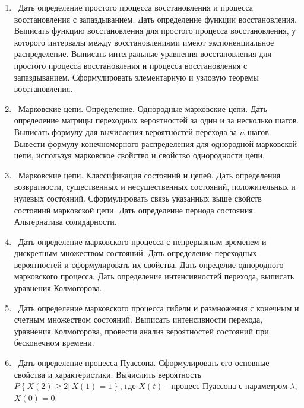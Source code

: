 %
%


\begin{enumerate}

\item Дать определение простого процесса восстановления и процесса восстановления
с запаздыванием. Дать определение функции восстановления. Выписать
функцию восстановления для простого процесса восстановления, у которого
интервалы между восстановлениями имеют экспоненциальное распределение.
Выписать интегральные уравнения восстановления для простого процесса
восстановления и процесса восстановления с запаздыванием. Сформулировать
элементарную и узловую теоремы восстановления.

\item Марковские цепи. Определение. Однородные марковские цепи. Дать
определение матрицы переходных вероятностей за один и за несколько
шагов. Выписать формулу для вычисления вероятностей перехода за $n$
шагов. Вывести формулу конечномерного распределения для однородной
марковской цепи, используя марковское свойство и свойство однородности
цепи.

\item Марковские цепи. Классификация состояний и цепей. Дать определения
возвратности, существенных и несущественных состояний, положительных
и нулевых состояний. Сформулировать связь указанных выше свойств состояний
марковской цепи. Дать определение периода состояния. Альтернатива
солидарности.

\item Дать определение марковского процесса с непрерывным временем и
дискретным множеством состояний.  Дать определение переходных вероятностей
и сформулировать их свойства. Дать определие однородного марковского
процесса. Дать определение интенсивностей перехода, выписать уравнения
Колмогорова. 

\item Дать определение марковского процесса гибели и размножения с конечным
и счетным множеством состояний. Выписать интенсивности перехода, уравнения
Колмогорова, провести анализ вероятностей состояний при бесконечном
времени. 

\item Дать определение процесса Пуассона. Сформулировать его основные
свойства и характеристики. Вычислить вероятность $P\left\{ X\left(2\right)\geq2|\, X\left(1\right)=1\right\} $,
где $X\left(t\right)$ - процесс Пуассона с параметром $\lambda$,
$X\left(0\right)=0$.

\end{enumerate}

